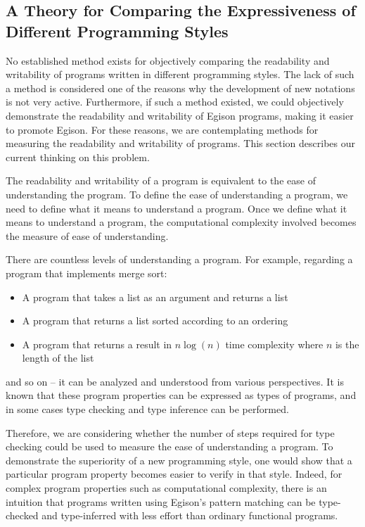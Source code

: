\subsection{A Theory for Comparing the Expressiveness of Different Programming Styles}

No established method exists for objectively comparing the readability and writability of programs written in different programming styles.
The lack of such a method is considered one of the reasons why the development of new notations is not very active.
Furthermore, if such a method existed, we could objectively demonstrate the readability and writability of Egison programs, making it easier to promote Egison.
For these reasons, we are contemplating methods for measuring the readability and writability of programs.
This section describes our current thinking on this problem.

The readability and writability of a program is equivalent to the ease of understanding the program.
To define the ease of understanding a program, we need to define what it means to understand a program.
Once we define what it means to understand a program, the computational complexity involved becomes the measure of ease of understanding.

There are countless levels of understanding a program.
For example, regarding a program that implements merge sort:
\begin{itemize}
\item A program that takes a list as an argument and returns a list
\item A program that returns a list sorted according to an ordering
\item A program that returns a result in $n \log(n)$ time complexity where $n$ is the length of the list
\end{itemize}
and so on -- it can be analyzed and understood from various perspectives.
It is known that these program properties can be expressed as types of programs, and in some cases type checking and type inference can be performed.

Therefore, we are considering whether the number of steps required for type checking could be used to measure the ease of understanding a program.
To demonstrate the superiority of a new programming style, one would show that a particular program property becomes easier to verify in that style.
Indeed, for complex program properties such as computational complexity, there is an intuition that programs written using Egison's pattern matching can be type-checked and type-inferred with less effort than ordinary functional programs.

